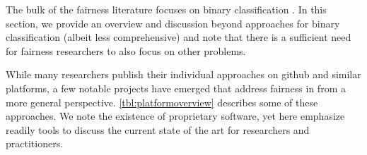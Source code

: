 \label{sec:beyond}
The bulk of the fairness literature focuses on binary classification  . In this section, we provide an overview and discussion beyond approaches for binary classification (albeit less comprehensive) and note that there is a sufficient need for fairness researchers to also focus on other \ml problems. 





\label{sec:platforms}
While many researchers publish their individual approaches on github and similar platforms, a few notable projects have emerged that address fairness in \ml from a more general perspective. \autoref{tbl:platformoverview} describes some of these approaches. We note the existence of proprietary software, yet here emphasize readily tools to discuss the current state of the art for \ml researchers and practitioners. 
